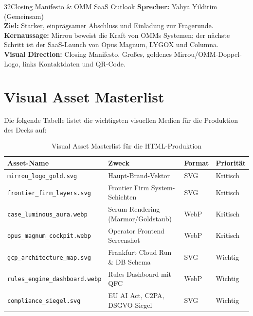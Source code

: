 \documentclass[11pt,a4paper]{article}
\begin{document}
\begin{slidebox}{32}{Closing Manifesto \& OMM SaaS Outlook}
    \textbf{Sprecher:} Yahya Yildirim (Gemeinsam) \\
    \textbf{Ziel:} Starker, einprägsamer Abschluss und Einladung zur Fragerunde.\\
    \textbf{Kernaussage:} Mirrou beweist die Kraft von OMMs Systemen; der nächste Schritt ist der SaaS-Launch von Opus Magnum, LYGOX und Columna.\\
    \textbf{Visual Direction:} Closing Manifesto. Großes, goldenes Mirrou/OMM-Doppel-Logo, links Kontaktdaten und QR-Code.
\end{slidebox}

\section{Visual Asset Masterlist}
Die folgende Tabelle listet die wichtigsten visuellen Medien für die Produktion des Decks auf:

\begin{table}[h]
    \centering
    \small
    \begin{tabularx}{\textwidth}{l X l l}
        \toprule
        \textbf{Asset-Name} & \textbf{Zweck} & \textbf{Format} & \textbf{Priorität} \\
        \midrule
        \texttt{mirrou\_logo\_gold.svg} & Haupt-Brand-Vektor & SVG & Kritisch \\
        \texttt{frontier\_firm\_layers.svg} & Frontier Firm System-Schichten & SVG & Kritisch \\
        \texttt{case\_luminous\_aura.webp} & Serum Rendering (Marmor/Goldstaub) & WebP & Kritisch \\
        \texttt{opus\_magnum\_cockpit.webp} & Operator Frontend Screenshot & WebP & Kritisch \\
        \texttt{gcp\_architecture\_map.svg} & Frankfurt Cloud Run \& DB Schema & SVG & Wichtig \\
        \texttt{rules\_engine\_dashboard.webp} & Rules Dashboard mit QFC & WebP & Wichtig \\
        \texttt{compliance\_siegel.svg} & EU AI Act, C2PA, DSGVO-Siegel & SVG & Wichtig \\
        \bottomrule
    \end{tabularx}
    \caption{Visual Asset Masterlist für die HTML-Produktion}
\end{table}
\end{document}
